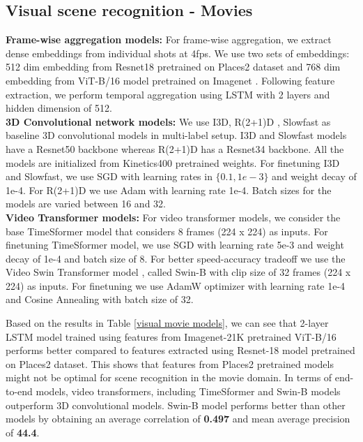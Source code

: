 \subsection{Visual scene recognition - Movies}
\textbf{Frame-wise aggregation models:} For frame-wise aggregation, we extract dense embeddings from individual shots at 4fps. We use two sets of embeddings: 512 dim embedding from Resnet18 \cite{He2015} pretrained on Places2 dataset and 768 dim embedding from ViT-B/16 \cite{dosovitskiy2020vit} model pretrained on Imagenet \cite{Deng2009ImageNetAL}.
Following feature extraction, we perform temporal aggregation using LSTM \cite{lstm} with 2 layers and hidden dimension of 512.
\\
\textbf{3D Convolutional network models:} 
We use I3D\cite{i3d}, R(2+1)D \cite{r2plus1d}, Slowfast \cite{feichtenhofer2019slowfast} as baseline 3D convolutional models in multi-label setup. I3D\cite{i3d} and Slowfast\cite{feichtenhofer2019slowfast} models have a Resnet50\cite{He2015} backbone whereas R(2+1)D \cite{r2plus1d} has a Resnet34\cite{He2015} backbone. All the models are initialized from Kinetics400 \cite{kinetics400} pretrained weights. For finetuning I3D\cite{i3d} and Slowfast\cite{feichtenhofer2019slowfast}, we use SGD with learning rates in $\{0.1,1e-3\}$ and weight decay of 1e-4. For R(2+1)D \cite{r2plus1d} we use Adam \cite{Kingma2015AdamAM} with learning rate 1e-4. Batch sizes for the models are varied between 16 and 32. \\
\textbf{Video Transformer models:}
For video transformer models, we consider the base TimeSformer model \cite{Bertasius2021IsSA} that considers 8 frames (224 x 224) as inputs. For finetuning TimeSformer \cite{Bertasius2021IsSA} model, we use SGD with learning rate 5e-3 and weight decay of 1e-4 and batch size of 8. For better speed-accuracy tradeoff we use the Video Swin Transformer model \cite{liu2021video}, \cite{liu2021Swin} called Swin-B with clip size of 32 frames (224 x 224) as inputs. For finetuning we use AdamW \cite{Loshchilov2019DecoupledWD} optimizer with learning rate 1e-4 and Cosine Annealing with batch size of 32. 
\par 
Based on the results in Table \ref{visual movie models}, we can see that 2-layer LSTM model trained using features from Imagenet-21K pretrained ViT-B/16 performs better compared to features extracted using Resnet-18 model pretrained on Places2 dataset. This shows that features from Places2 pretrained models might not be optimal for scene recognition in the movie domain.
In terms of end-to-end models, video transformers, including TimeSformer and Swin-B models outperform 3D convolutional models. Swin-B model performs better than other models by obtaining an average correlation of \textbf{0.497} and mean average precision of \textbf{44.4}.
